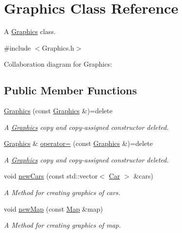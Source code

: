 \hypertarget{classGraphics}{}\section{Graphics Class Reference}
\label{classGraphics}


A \hyperlink{classGraphics}{Graphics} class.  




{\ttfamily \#include $<$Graphics.\+h$>$}



Collaboration diagram for Graphics\+:
\subsection*{Public Member Functions}
\begin{DoxyCompactItemize}
\item 
\hyperlink{classGraphics_abe2f13f24a1d35c55fdac10a282744eb}{Graphics} (const \hyperlink{classGraphics}{Graphics} \&)=delete
\begin{DoxyCompactList}\small\item\em A \hyperlink{classGraphics}{Graphics} copy and copy-\/assigned constructor deleted. \end{DoxyCompactList}\item 
\hyperlink{classGraphics}{Graphics} \& \hyperlink{classGraphics_abaf6bc20f9541026835dfee157ac5efb}{operator=} (const \hyperlink{classGraphics}{Graphics} \&)=delete
\begin{DoxyCompactList}\small\item\em A \hyperlink{classGraphics}{Graphics} copy and copy-\/assigned constructor deleted. \end{DoxyCompactList}\item 
void \hyperlink{classGraphics_aee9384443642037cef28b28acddf86d3}{new\+Cars} (const std\+::vector$<$ \hyperlink{classCar}{Car} $>$ \&cars)
\begin{DoxyCompactList}\small\item\em A Method for creating graphics of cars. \end{DoxyCompactList}\item 
void \hyperlink{classGraphics_adf0937a71f5d477bcd9c553fe863e87b}{new\+Map} (const \hyperlink{classMap}{Map} \&map)
\begin{DoxyCompactList}\small\item\em A Method for creating graphics of map. \end{DoxyCompactList}\item 

\end{DoxyCompactItemize}
